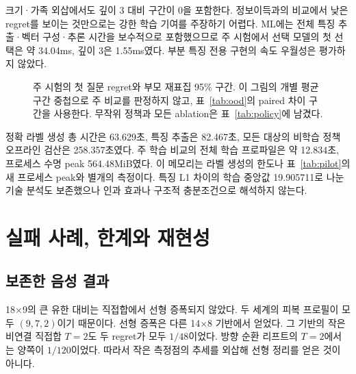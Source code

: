 \documentclass[11pt,a4paper]{article}
\theoremstyle{definition}
\theoremstyle{remark}\newtheorem{remark}[theorem]{주석}
\begin{document}
크기·가족 외삽에서도 깊이 3 대비 구간이 0을 포함한다. 정보이득과의 비교에서 낮은 regret를 보이는 것만으로는 강한 학습 기여를 주장하기 어렵다. ML에는 전체 특징 추출·벡터 구성·추론 시간을 보수적으로 포함했으므로 주 시험에서 선택 모델의 첫 선택은 약 34.04ms, 깊이 3은 1.55ms였다. 부분 특징 전용 구현의 속도 우월성은 평가하지 않았다.

\begin{figure}[htbp]\centering
{}
\caption{주 시험의 첫 질문 regret와 부모 재표집 95\% 구간. 이 그림의 개별 평균 구간 중첩으로 주 비교를 판정하지 않고, 표~\ref{tab:ood}의 paired 차이 구간을 사용한다. 무작위 정책과 모든 ablation은 표~\ref{tab:policy}에 남겼다.}\label{fig:ml}
\end{figure}

정확 라벨 생성 총 시간은 63.629초, 특징 추출은 82.467초, 모든 대상의 비학습 정책 오프라인 검산은 258.357초였다. 주 학습 비교의 전체 학습 프로파일은 약 12.834초, 프로세스 수명 peak 564.48MiB였다. 이 메모리는 라벨 생성의 한도나 표~\ref{tab:pilot}의 새 프로세스 peak와 별개의 측정이다. 특징 L1 차이의 학습 중앙값 19.905711로 나눈 기술 분석도 보존했으나 인과 효과나 구조적 충분조건으로 해석하지 않는다.

\section{실패 사례, 한계와 재현성}\label{sec:limits}
\subsection{보존한 음성 결과}
18×9의 큰 유한 대비는 직접합에서 선형 증폭되지 않았다. 두 세계의 피복 프로필이 모두 $(9,7,2)$이기 때문이다. 선형 증폭은 다른 14×8 기반에서 얻었다. 그 기반의 작은 비연결 직접합 $T=2$도 두 regret가 모두 $1/48$이었다. 방향 순환 리프트의 $T=2$에서는 양쪽이 $1/120$이었다. 따라서 작은 측정점의 추세를 외삽해 선형 정리를 얻은 것이 아니다.
\end{document}
